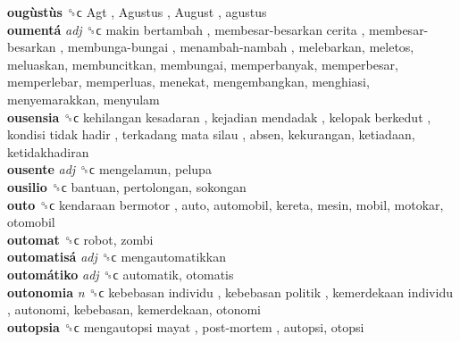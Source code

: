 \textbf{ougùstùs} ␝ϲ   Agt ,  Agustus ,  August , agustus  \\
\textbf{oumentá} \emph{adj}  ␝ϲ   makin bertambah ,  membesar-besarkan cerita ,  membesar-besarkan ,  membunga-bungai ,  menambah-nambah , melebarkan, meletos, meluaskan, membuncitkan, membungai, memperbanyak, memperbesar, memperlebar, memperluas, menekat, mengembangkan, menghiasi, menyemarakkan, menyulam  \\
\textbf{ousensia} ␝ϲ   kehilangan kesadaran ,  kejadian mendadak ,  kelopak berkedut ,  kondisi tidak hadir ,  terkadang mata silau , absen, kekurangan, ketiadaan, ketidakhadiran  \\
\textbf{ousente} \emph{adj}  ␝ϲ  mengelamun, pelupa  \\
\textbf{ousilio} ␝ϲ  bantuan, pertolongan, sokongan  \\
\textbf{outo} ␝ϲ   kendaraan bermotor , auto, automobil, kereta, mesin, mobil, motokar, otomobil  \\
\textbf{outomat} ␝ϲ  robot, zombi  \\
\textbf{outomatisá} \emph{adj}  ␝ϲ  mengautomatikkan  \\
\textbf{outomátiko} \emph{adj}  ␝ϲ  automatik, otomatis  \\
\textbf{outonomia} \emph{n}  ␝ϲ   kebebasan individu ,  kebebasan politik ,  kemerdekaan individu , autonomi, kebebasan, kemerdekaan, otonomi  \\
\textbf{outopsia} ␝ϲ   mengautopsi mayat ,  post-mortem , autopsi, otopsi  \\
